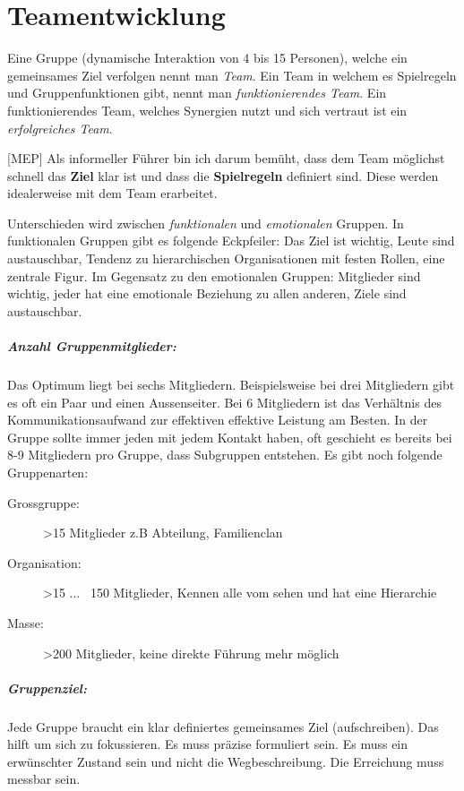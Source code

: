 \chapter{Teamentwicklung}

Eine Gruppe (dynamische Interaktion von 4 bis 15 Personen), welche ein gemeinsames Ziel verfolgen nennt man \textit{Team}. Ein Team in welchem es Spielregeln und Gruppenfunktionen gibt, nennt man \textit{funktionierendes Team}. Ein funktionierendes Team, welches Synergien nutzt und sich vertraut ist ein \textit{erfolgreiches Team}.

[MEP] Als informeller Führer bin ich darum bemüht, dass dem Team möglichst schnell das \textbf{Ziel} klar ist und dass die \textbf{Spielregeln} definiert sind. Diese werden idealerweise mit dem Team erarbeitet.

Unterschieden wird zwischen \textit{funktionalen} und \textit{emotionalen} Gruppen. In funktionalen Gruppen gibt es folgende Eckpfeiler: Das Ziel ist wichtig, Leute sind austauschbar, Tendenz zu hierarchischen Organisationen mit festen Rollen, eine zentrale Figur. Im Gegensatz zu den emotionalen Gruppen: Mitglieder sind wichtig, jeder hat eine emotionale Beziehung zu allen anderen, Ziele sind austauschbar.

\paragraph{Anzahl Gruppenmitglieder:} Das Optimum liegt bei sechs Mitgliedern. Beispielsweise bei drei Mitgliedern gibt es oft ein Paar und einen Aussenseiter. Bei 6 Mitgliedern ist das Verhältnis des Kommunikationsaufwand zur effektiven effektive Leistung am Besten. In der Gruppe sollte immer jeden mit jedem Kontakt haben, oft geschieht es bereits bei 8-9 Mitgliedern pro Gruppe, dass Subgruppen entstehen. Es gibt noch folgende Gruppenarten:
\begin{description}
	\item[Grossgruppe:] >15 Mitglieder z.B Abteilung, Familienclan
	\item[Organisation:] >15 ... ~150 Mitglieder, Kennen alle vom sehen und hat eine Hierarchie
	\item[Masse:] >200 Mitglieder, keine direkte Führung mehr möglich
\end{description}

\paragraph{Gruppenziel:} Jede Gruppe braucht ein klar definiertes gemeinsames Ziel (aufschreiben). Das hilft um sich zu fokussieren. Es muss präzise formuliert sein. Es muss ein erwünschter Zustand sein und nicht die Wegbeschreibung. Die Erreichung muss messbar sein.

